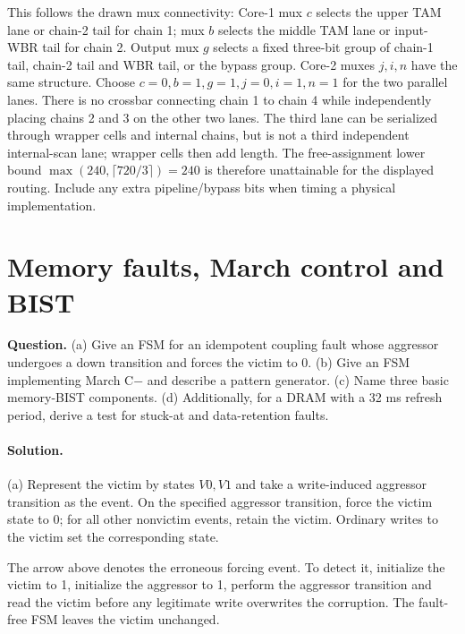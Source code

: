 \documentclass[11pt]{article}
\newcommand{\sol}{\paragraph{Solution.}}
\begin{document}
This follows the drawn mux connectivity: Core-1 mux $c$ selects the upper
TAM lane or chain-2 tail for chain 1; mux $b$ selects the middle TAM lane
or input-WBR tail for chain 2. Output mux $g$ selects a fixed three-bit group
of chain-1 tail, chain-2 tail and WBR tail, or the bypass group.
Core-2 muxes $j,i,n$ have the same structure.
Choose $c=0,b=1,g=1,j=0,i=1,n=1$ for the two parallel lanes.
There is no crossbar connecting chain 1 to chain 4 while independently placing
chains 2 and 3 on the other two lanes. The third lane can be serialized through
wrapper cells and internal chains, but is not a third independent internal-scan
lane; wrapper cells then add length.
The free-assignment lower bound $\max(240,\lceil720/3\rceil)=240$ is therefore
unattainable for the displayed routing. Include any extra pipeline/bypass bits
when timing a physical implementation.

\section{Memory faults, March control and BIST}
\textbf{Question.} (a) Give an FSM for an idempotent coupling fault
whose aggressor undergoes a down transition and forces the victim to 0.
(b) Give an FSM implementing March C$-$ and describe a pattern generator.
(c) Name three basic memory-BIST components.
(d) Additionally, for a DRAM with a 32 ms refresh period,
derive a test for stuck-at and data-retention faults.
\sol (a) Represent the victim by states $V0,V1$ and take a write-induced
aggressor transition as the event. On the specified aggressor transition, force
the victim state to 0; for all other nonvictim events, retain the victim.
Ordinary writes to the victim set the corresponding state.
\begin{center}\end{center}

The arrow above denotes the erroneous forcing event.
To detect it, initialize the victim to 1,
initialize the aggressor to 1,
perform the aggressor transition and read the victim before any legitimate
write overwrites the corruption. The fault-free FSM leaves the victim unchanged.
\end{document}
